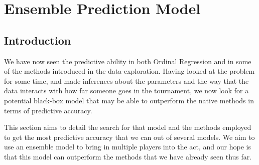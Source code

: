 \documentclass[10pt,a4paper, hidelinks]{article} %
\begin{document}
%


\section{Ensemble Prediction Model}
\subsection{Introduction}

We have now seen the predictive ability in both Ordinal Regression and in some of the methods introduced in the data-exploration. Having looked at the problem for some time, and made inferences about the parameters and the way that the data interacts with how far someone goes in the tournament, we now look for a potential black-box model that may be able to outperform the native methods in terms of predictive accuracy. 

This section aims to detail the search for that model and the methods employed to get the most predictive accuracy that we can out of several models. We aim to use an ensemble model to bring in multiple players into the act, and our hope is that this model can outperform the methods that we have already seen thus far. 
\end{document}
